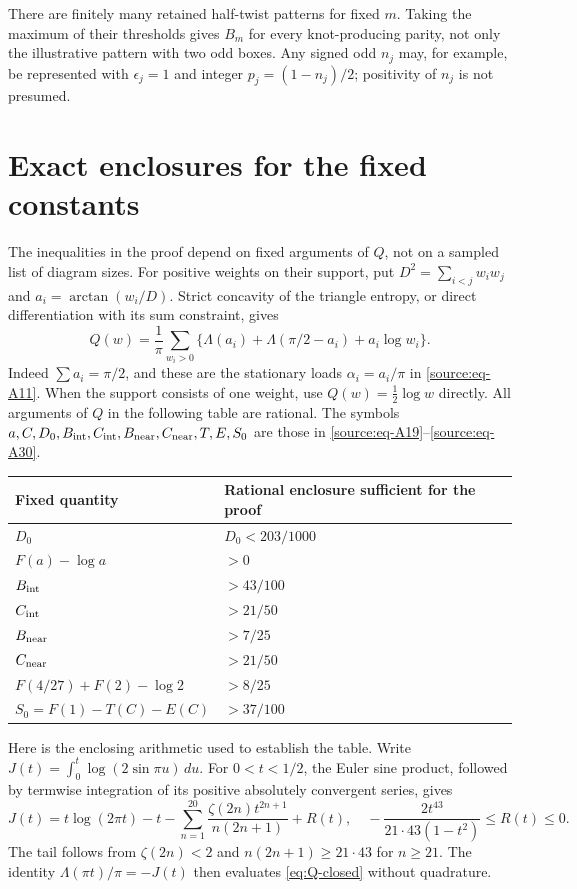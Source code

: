 \documentclass[11pt]{article}
\numberwithin{equation}{section}
\begin{document}
There are finitely many retained half-twist patterns for fixed \(m\).
Taking the maximum of their thresholds gives \(B_m\) for every
knot-producing parity, not only the illustrative pattern with two odd
boxes. Any signed odd \(n_j\) may, for example, be represented with
\(\epsilon_j=1\) and integer \(p_j=(1-n_j)/2\); positivity of \(n_j\) is
not presumed.


\appendix
\section{Exact enclosures for the fixed constants}\label{app:constants}

The inequalities in the proof depend on fixed arguments of \(Q\),
not on a sampled list of diagram sizes. For positive weights on their
support, put \(D^2=\sum_{i<j}w_iw_j\) and
\(a_i=\arctan(w_i/D)\). Strict concavity of the triangle entropy, or
direct differentiation with its sum constraint, gives
\begin{equation}\label{eq:Q-closed}
 Q(w)=\frac1\pi\sum_{w_i>0}
 \{\Lambda(a_i)+\Lambda(\pi/2-a_i)+a_i\log w_i\}.
\end{equation}
Indeed \(\sum a_i=\pi/2\), and these are the stationary loads
\(\alpha_i=a_i/\pi\) in \eqref{source:eq-A11}.
When the support consists of one weight, use \(Q(w)=\tfrac12\log w\)
directly. All arguments of \(Q\) in the following table are rational.
The symbols \(a,C,D_0,B_{\rm int},C_{\rm int},B_{\rm near},C_{\rm near},T,E,S_0\)
are those in \eqref{source:eq-A19}--\eqref{source:eq-A30}.

\begin{center}
\begin{tabular}{ll}
\toprule
Fixed quantity & Rational enclosure sufficient for the proof\\
\midrule
\(D_0\) & \(D_0<203/1000\)\\
\(F(a)-\log a\) & \(>0\)\\
\(B_{\rm int}\) & \(>43/100\)\\
\(C_{\rm int}\) & \(>21/50\)\\
\(B_{\rm near}\) & \(>7/25\)\\
\(C_{\rm near}\) & \(>21/50\)\\
\(F(4/27)+F(2)-\log2\) & \(>8/25\)\\
\(S_0=F(1)-T(C)-E(C)\) & \(>37/100\)\\
\bottomrule
\end{tabular}
\end{center}

Here is the enclosing arithmetic used to establish the table. Write
\(J(t)=\int_0^t\log(2\sin\pi u)\,du\). For \(0<t<1/2\), the Euler
sine product, followed by termwise integration of its positive
absolutely convergent series, gives
\begin{equation}\label{eq:J-series}
 J(t)=t\log(2\pi t)-t-
 \sum_{n=1}^{20}\frac{\zeta(2n)t^{2n+1}}{n(2n+1)}+R(t),
 \quad -\frac{2t^{43}}{21\cdot43(1-t^2)}\le R(t)\le0.
\end{equation}
The tail follows from \(\zeta(2n)<2\) and
\(n(2n+1)\ge21\cdot43\) for \(n\ge21\). The identity
\(\Lambda(\pi t)/\pi=-J(t)\) then evaluates
\eqref{eq:Q-closed} without quadrature.
\end{document}
